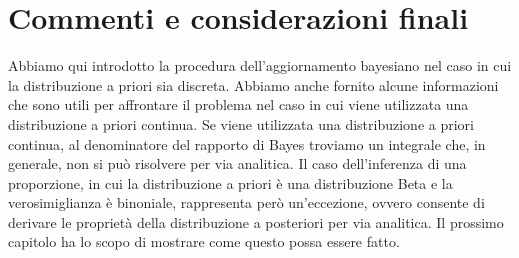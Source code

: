 \documentclass[
  11pt,
]{krantz}
\theoremstyle{definition}
\theoremstyle{definition}
\theoremstyle{definition}
\theoremstyle{definition}
\theoremstyle{remark}
\begin{document}
\hypertarget{commenti-e-considerazioni-finali-1}{%
\section*{Commenti e considerazioni finali}\label{commenti-e-considerazioni-finali-1}}


Abbiamo qui introdotto la procedura dell'aggiornamento bayesiano nel caso in cui la distribuzione a priori sia discreta. Abbiamo anche fornito alcune informazioni che sono utili per affrontare il problema nel caso in cui viene utilizzata una distribuzione a priori continua. Se viene utilizzata una distribuzione a priori continua, al denominatore del rapporto di Bayes troviamo un integrale che, in generale, non si può risolvere per via analitica. Il caso dell'inferenza di una proporzione, in cui la distribuzione a priori è una distribuzione Beta e la verosimiglianza è binoniale, rappresenta però un'eccezione, ovvero consente di derivare le proprietà della distribuzione a posteriori per via analitica. Il prossimo capitolo ha lo scopo di mostrare come questo possa essere fatto.

  

\printindex
\end{document}
